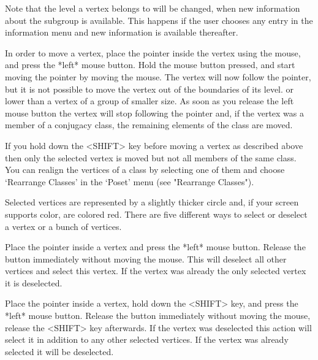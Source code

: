 Note that the level a vertex belongs to will be changed, when new
information about the subgroup is available. This happens if the user
chooses any entry in the information menu and new information is
available thereafter.



In order to move a vertex, place the  pointer inside the vertex using the
mouse, and press the *left* mouse button.  Hold the mouse button pressed,
and start moving  the pointer by moving  the mouse.  The  vertex will now
follow the pointer, but it is not possible to move the vertex out of
the boundaries of its level.
or lower than a vertex of a group of smaller
size.
As soon as you release the left mouse
button the vertex will stop following the pointer  and, if the vertex was
a member of a  conjugacy class, the remaining elements  of the class  are
moved.

If you hold  down  the <SHIFT> key before  moving  a vertex as  described
above then  only the selected vertex is moved but not all members of the
same class. You can realign the vertices of a class by selecting one of
them and choose `Rearrange Classes' in the `Poset' menu 
(see "Rearrange Classes").


Selected vertices are represented by a slightly thicker circle and, if
your screen supports color, are colored red.  There are five different
ways to select or deselect a vertex or a bunch of vertices.

Place the  pointer inside  a  vertex and press   the *left* mouse button.
Release   the button immediately   without  moving the  mouse.  This will
deselect all other vertices  and select this vertex.   If the vertex  was
already the only selected vertex it is deselected.

Place the  pointer inside a vertex, hold  down the <SHIFT> key, and press
the  *left* mouse button.   Release the button immediately without moving
the    mouse, release the   <SHIFT> key  afterwards.   If  the vertex was
deselected this action will  select it in  addition to any other selected
vertices. If the vertex was already selected it will be deselected.

